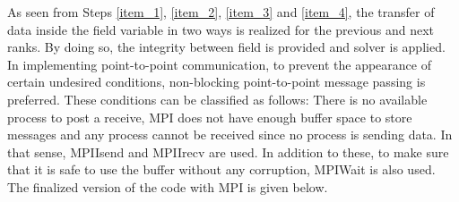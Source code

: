 \documentclass{article}
\begin{document}
As seen from Steps \ref{item_1}, \ref{item_2}, \ref{item_3} and \ref{item_4}, the transfer of data inside the field variable in two ways is realized for the previous and next ranks. By doing so, the integrity between field is provided and solver is applied. In implementing point-to-point communication, to prevent the appearance of certain undesired conditions, non-blocking point-to-point message passing is preferred. These conditions can be classified as follows: There is no available process to post a receive, MPI does not have enough buffer space to store messages and any process cannot be received since no process is sending data. In that sense, MPI\textunderscore Isend and MPI\textunderscore Irecv are used. In addition to these, to make sure that it is safe to use the buffer without any corruption, MPI\textunderscore Wait is also used. The finalized version of the code with MPI is given below. 
\end{document}
